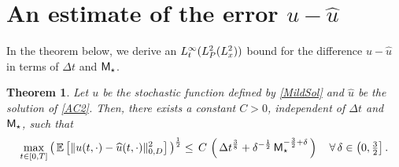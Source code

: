 \documentclass[10pt]{amsart}
\newtheorem{theorem}{Theorem}[section]
\numberwithin{equation}{section}
\begin{document}
\section{An estimate of the error $u-{\widehat u}$}\label{SECTION2}
In the theorem below, we derive an $L^{\infty}_t(L^2_{{\scriptscriptstyle}
P}(L^2_x))$ bound for the difference $u-{\widehat u}$ in terms of $\Delta{t}$
and ${\sf M}_{\star}$.
\begin{theorem}\label{BIG_Qewrhma1}
Let $u$ be the stochastic function defined by \eqref{MildSol} and
${\widehat u}$ be the solution of \eqref{AC2}.
Then, there exists a constant $C>0$, independent
of $\Delta{t}$ and ${\sf M}_{\star}$, such that
\begin{equation}\label{ModelError}
\max_{{\scriptscriptstyle} t\in[0,T]}\left(\,{\mathbb E}\left[\|u(t,\cdot)
-{\widehat u}(t,\cdot)\|_{{\scriptscriptstyle} 0,D}^2\right]\,\right)^{\frac{1}{2}}
\leq\,C\,\left(\,\Delta{t}^\frac{3}{8}+\delta^{-{\frac{1}{2}}}
\,{\sf M}_{\star}^{-\frac{3}{2}+\delta}\,\right)
\quad\forall\,\delta\in\left(0,\tfrac{3}{2}\right].
\end{equation}
\end{theorem}
\end{document}
